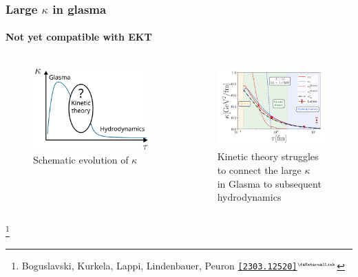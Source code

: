 \documentclass[aspectratio=169,11pt,usenames,dvipsnames]{beamer}
\renewcommand{\thefootnote}{\color{customblue}\faPaperPlaneO}
\newcommand\blfootnote[1]{%
  \begingroup
  \renewcommand\thefootnote{}\footnote{#1}%
  \addtocounter{footnote}{-1}%
  \endgroup
}
\begin{document}
\begin{frame}
    \frametitle{Large $\kappa$ in glasma}
    \framesubtitle{Not yet compatible with EKT}
    \vspace{-0.4cm}
    \begin{columns}[onlytextwidth,t]
        \begin{figure}[!hbt]
            \centering
            \captionsetup{justification=centering}
            \caption{Schematic evolution of $\kappa$}\vspace{-0.3cm}
            \includegraphics[width=0.8\columnwidth]{images/kappa_schematic.png}\vspace{-0.3cm}
        \end{figure}
        \begin{figure}[!hbt]
            \centering
            \captionsetup{justification=centering}
            \caption{{\color{ForestGreen}Kinetic theory} struggles to connect the large $\kappa$\\ in {\color{Dandelion}Glasma} to subsequent {\color{Periwinkle}hydrodynamics}}\vspace{-0.2cm}
            \includegraphics[width=0.8\columnwidth]{images/KappaGlasmaVsEKTvsLatticev2.pdf}
        \end{figure}
    \end{columns}   

    \blfootnote{\scriptsize Boguslavski, Kurkela, Lappi, Lindenbauer, Peuron \href{https://arxiv.org/abs/2303.12520}{{\color{ForestGreen}\texttt{[2303.12520]}$^\text{\tiny\faExternalLink}$}}}
\end{frame}
\end{document}
